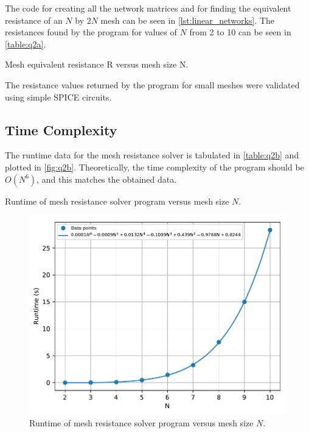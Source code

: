 \documentclass[a4paper,titlepage]{article}
\begin{document}
	The code for creating all the network matrices and for finding the equivalent resistance of an $N$ by $2N$ mesh can be seen in \autoref{lst:linear_networks}. The resistances found by the program for values of $N$ from 2 to 10 can be seen in \autoref{table:q2a}.
	
	\begin{table}[!htb]
		\centering
		\caption{Mesh equivalent resistance R versus mesh size N.}
		\label{table:q2a}
	\end{table}

	The resistance values returned by the program for small meshes were validated using simple SPICE circuits. %
	
	\subsection{Time Complexity}
	
	The runtime data for the mesh resistance solver is tabulated in \autoref{table:q2b} and plotted in \autoref{fig:q2b}. Theoretically, the time complexity of the program should be $O(N^6)$, and this matches the obtained data.
	
	\begin{table}[!htb]
		\centering
		\caption{Runtime of mesh resistance solver program versus mesh size $N$.}
		\label{table:q2b}
	\end{table}

	\begin{figure}[!htb]
		\centering
		\includegraphics[width=\columnwidth]{plots/q2b.pdf}
		\caption
		{Runtime of mesh resistance solver program versus mesh size $N$.}
		\label{fig:q2b}
	\end{figure}
	
\end{document}
